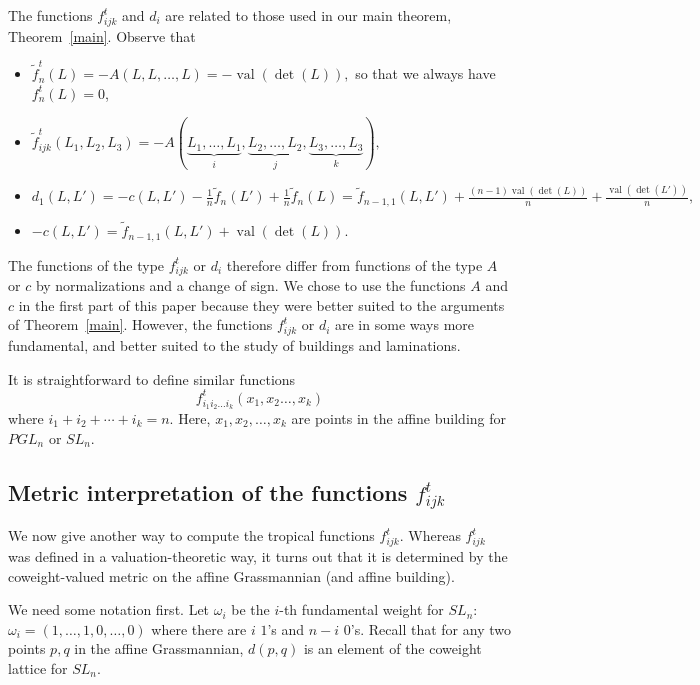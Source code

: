 \documentclass[ALCO,ThmDefs,Unicode,epreuves]{cedram}
\newcommand{\val}{\operatorname{val}}
\begin{document}
\begin{rema} \label{normalization} The functions $f_{ijk}^t$ and $d_i$ are related to those used in our main theorem, Theorem~\ref{main}. Observe that

\begin{itemize}
\item $\tilde{f}^t_n(L)= -A(L, L, \dots, L) = -\val(\det(L)),$ so that we always have $f^t_n(L)=0$,
\item $\tilde{f}_{ijk}^t (L_1,L_2,L_3) = -A(\underbrace{L_1,\ldots,L_1}_{i}, \underbrace{L_2,\ldots,L_2}_{j}, \underbrace{L_3,\ldots,L_3}_{k}),$
\item $d_1(L, L') = -c(L, L') - \frac{1}{n} \tilde{f}_n(L') + \frac{1}{n} \tilde{f}_n(L) = \tilde{f}_{n-1,1}(L,L') + \frac{(n-1)\val(\det(L))}{n} + \frac{\val(\det(L'))}{n},$ 
\item $-c(L, L') = \tilde{f}_{n-1,1}(L,L') + \val(\det(L)).$
\end{itemize}

The functions of the type $f_{ijk}^t$ or $d_i$ therefore differ from functions of the type $A$ or $c$ by normalizations and a change of sign. We chose to use the functions $A$ and $c$ in the first part of this paper because they were better suited to the arguments of Theorem~\ref{main}. However, the functions $f_{ijk}^t$ or $d_i$ are in some ways more fundamental, and better suited to the study of buildings and laminations.

\end{rema}

It is straightforward to define similar functions 
\[
f_{i_1i_2\dots i_k}^t(x_1,x_2\dots,x_k) %
\]
where $i_1+i_2+\cdots+i_k=n$. Here, $x_1, x_2, \dots, x_k$ are points in the affine building for $PGL_n$ or $SL_n$.

\subsection{Metric interpretation of the functions \texorpdfstring{$f^t_{ijk}$}{f ijk t}}

We now give another way to compute the tropical functions $f_{ijk}^t$. Whereas $f_{ijk}^t$ was defined in a valuation-theoretic way, it turns out that it is determined by the coweight-valued metric on the affine Grassmannian (and affine building).

We need some notation first. Let $\omega_i$ be the $i$-th fundamental weight for $SL_n$: $\omega_i = (1, \dots, 1, 0, \dots, 0)$ where there are $i$ $1$'s and $n-i$ $0$'s. Recall that for any two points $p, q$ in the affine Grassmannian, $d(p,q)$ is an element of the coweight lattice for $SL_n$.
\end{document}
